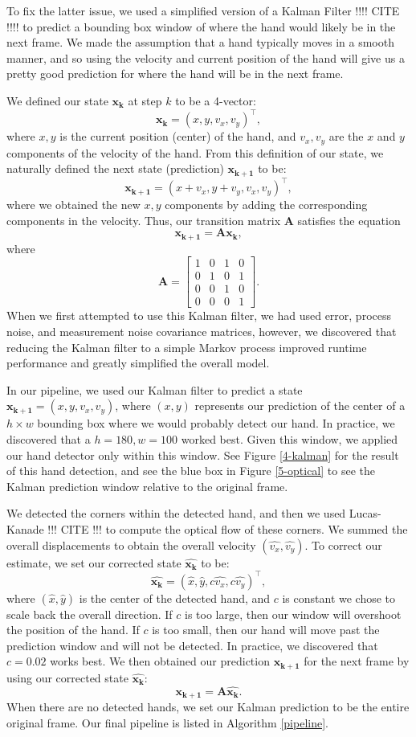 \documentclass[12pt]{article}
\newcommand{\m}[1]{\mathbf{#1}}
\newcommand{\transpose}[1]{{#1}^\top}
\begin{document}
To fix the latter issue, we used a simplified version of a Kalman Filter !!!! CITE !!!! to predict a bounding box window of where the hand would likely be in the next frame. We made the assumption that a hand typically moves in a smooth manner, and so using the velocity and current position of the hand will give us a pretty good prediction for where the hand will be in the next frame. 

We defined our state $\m{x_k}$ at step $k$ to be a 4-vector:
$$\m{x_k} = \transpose{(x, y, v_x, v_y)},$$
where $x,y$ is the current position (center) of the hand, and $v_x, v_y$ are the $x$ and $y$ components of the velocity of the hand. From this definition of our state, we naturally defined the next state (prediction) $\m{x_{k+1}}$ to be:
$$\m{x_{k+1}} = \transpose{(x + v_x, y + v_y, v_x, v_y)},$$
where we obtained the new $x,y$ components by adding the corresponding components in the velocity. Thus, our transition matrix $\m{A}$ satisfies the equation
$$\m{x_{k+1}} = \m{A} \m{x_k},$$
where
$$\m{A} = 
\begin{bmatrix}
1 & 0 & 1 & 0 \\
0 & 1 & 0 & 1 \\
0 & 0 & 1 & 0 \\
0 & 0 & 0 & 1
\end{bmatrix}.
$$
When we first attempted to use this Kalman filter, we had used error, process noise, and measurement noise covariance matrices, however, we discovered that reducing the Kalman filter to a simple Markov process improved runtime performance and greatly simplified the overall model. 

In our pipeline, we used our Kalman filter to predict a state $\m{x_{k+1}} = (x,y,v_x,v_y)$, where $(x,y)$ represents our prediction of the center of a $h \times w$ bounding box where we would probably detect our hand. In practice, we discovered that a $h = 180, w = 100$ worked best. Given this window, we applied our hand detector only within this window. See Figure \ref{4-kalman} for the result of this hand detection, and see the blue box in Figure \ref{5-optical} to see the Kalman prediction window relative to the original frame. 

We detected the corners within the detected hand, and then we used Lucas-Kanade !!! CITE !!! to compute the optical flow of these corners. We summed the overall displacements to obtain the overall velocity $(\hat{v_x}, \hat{{v_y}})$. To correct our estimate, we set our corrected state $\m{\hat{x_k}}$ to be:
$$\m{\hat{x_k}} = \transpose{(\hat{x}, \hat{y}, c\hat{v_x}, c\hat{v_y})},$$
where $(\hat{x},\hat{y})$ is the center of the detected hand, and $c$ is constant we chose to scale back the overall direction. If $c$ is too large, then our window will overshoot the position of the hand. If $c$ is too small, then our hand will move past the prediction window and will not be detected. In practice, we discovered that $c = 0.02$ works best. We then obtained our prediction $\m{x_{k+1}}$ for the next frame by using our corrected state $\m{\hat{x_k}}$:
$$\m{x_{k+1}} = \m{A} \m{\hat{x_k}}.$$
When there are no detected hands, we set our Kalman prediction to be the entire original frame. Our final pipeline is listed in Algorithm \ref{pipeline}.
\end{document}
